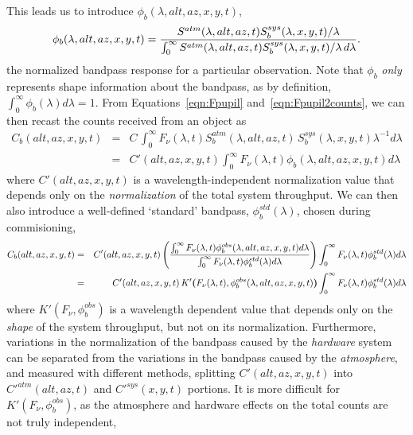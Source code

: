 \documentclass[12pt,preprint]{aastex}
\begin{document}
This leads us to introduce $\phi_b(\lambda,alt,az,x,y,t)$,
\begin{equation}
\label{eqn:PhiDef}
   \phi_b(\lambda,alt,az,x,y,t) = {
     {S^{atm}(\lambda,alt,az,t) S_b^{sys}(\lambda,x,y,t) \slash
       \lambda} \over
     \int_0^\infty { {S^{atm}(\lambda,alt,az,t) 
         S_b^{sys}(\lambda,x,y,t) \slash \lambda} \,d\lambda}}.
\end{equation}
the normalized bandpass response for a particular observation. Note
that $\phi_b$ {\it only} represents shape information about the
bandpass, as by definition, $\int_0^\infty {\phi_b(\lambda) d\lambda}=1$. 
From Equations~\ref{eqn:Fpupil} and~\ref{eqn:Fpupil2counts}, we can then
recast the counts received from an object as
\begin{eqnarray}
\label{eqn:fullcounts}
C_b(alt,az,x,y,t) & = & C \, \int_0^\infty {F_\nu(\lambda,t)
  S_b^{atm}(\lambda,alt,az,t) \, S_b^{sys}(\lambda,x,y,t)
  \lambda^{-1}d\lambda} \\
&= & C'(alt,az,x,y,t) 
     \int_0^\infty {F_\nu(\lambda,t)\phi_b(\lambda,alt,az,x,y,t)
       d\lambda} 
\end{eqnarray}
where $C'(alt,az,x,y,t)$ is a wavelength-independent normalization
value that depends only
on the {\it normalization} of the total system throughput. 
We can then also introduce a well-defined `standard' bandpass,
$\phi_b^{std}(\lambda)$, chosen during commisioning,
\begin{eqnarray}
C_b(alt,az,x,y,t) & = & C'(alt,az,x,y,t)
\left( {\int_0^\infty {F_\nu(\lambda,t)\phi_b^{obs}(\lambda,alt,az,x,y,t) d\lambda} \over 
\int_0^\infty {F_\nu(\lambda,t)\phi_b^{std}(\lambda) d\lambda}} 
\right) \int_0^\infty {F_\nu(\lambda,t)\phi_b^{std}(\lambda)  d\lambda}
\nonumber \\ 
& = & C'(alt,az,x,y,t) \, K'{\textbf(}F_\nu(\lambda,t),
\phi_b^{obs}(\lambda,alt,az,x,y,t){\textbf)}
\int_0^\infty {F_\nu(\lambda,t)\phi_b^{std}(\lambda)  d\lambda}
\end{eqnarray}
where $K'(F_\nu, \phi_b^{obs})$ is a wavelength dependent value that
depends only on the {\it shape} of the system throughput,
but not on its normalization.  Furthermore, variations in the
normalization of the bandpass caused by the {\it hardware} system can be separated from the
variations in the bandpass caused by the {\it atmosphere}, and
measured with different methods, splitting
$C'(alt,az,x,y,t)$ into $C'^{atm}(alt,az,t)$ and $C'^{sys}(x,y,t)$ portions. It
is more difficult for $K'(F_\nu, \phi_b^{obs})$, as the atmosphere and
hardware effects on the total counts are not truly independent,
\end{document}
